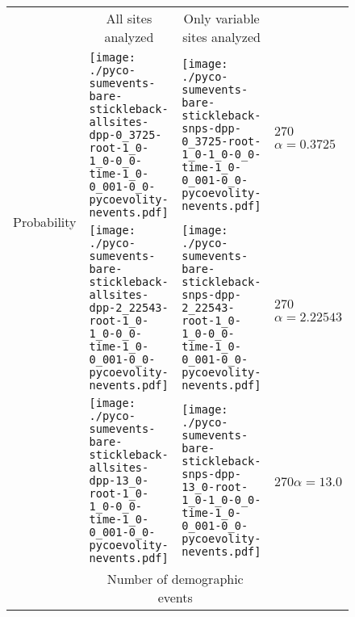 \documentclass[border=10pt,varwidth=30cm]{standalone}
\begin{document}
\begin{figure}
    \centering
    \begin{tabular}{@{}llll@{}}
        & \multicolumn{1}{c}{\large All sites analyzed} & \multicolumn{1}{c}{\large Only variable sites analyzed} & \\[1ex]
        \multirow{2}{*}[-4em]{\begin{sideways}\large Probability\end{sideways}}
        & \texttt{[image: ./pyco-sumevents-bare-stickleback-allsites-dpp-0\_3725-root-1\_0-1\_0-0\_0-time-1\_0-0\_001-0\_0-pycoevolity-nevents.pdf]}
        & \texttt{[image: ./pyco-sumevents-bare-stickleback-snps-dpp-0\_3725-root-1\_0-1\_0-0\_0-time-1\_0-0\_001-0\_0-pycoevolity-nevents.pdf]}
        & \multirow{1}{*}[8.5em]{\begin{rotate}{270}$\alpha = 0.3725$\end{rotate}} \\
        & \texttt{[image: ./pyco-sumevents-bare-stickleback-allsites-dpp-2\_22543-root-1\_0-1\_0-0\_0-time-1\_0-0\_001-0\_0-pycoevolity-nevents.pdf]}
        & \texttt{[image: ./pyco-sumevents-bare-stickleback-snps-dpp-2\_22543-root-1\_0-1\_0-0\_0-time-1\_0-0\_001-0\_0-pycoevolity-nevents.pdf]}
        & \multirow{1}{*}[8.5em]{\begin{rotate}{270}$\alpha = 2.22543$\end{rotate}} \\
        & \texttt{[image: ./pyco-sumevents-bare-stickleback-allsites-dpp-13\_0-root-1\_0-1\_0-0\_0-time-1\_0-0\_001-0\_0-pycoevolity-nevents.pdf]}
        & \texttt{[image: ./pyco-sumevents-bare-stickleback-snps-dpp-13\_0-root-1\_0-1\_0-0\_0-time-1\_0-0\_001-0\_0-pycoevolity-nevents.pdf]}
        & \multirow{1}{*}[8.5em]{\begin{rotate}{270}$\alpha = 13.0$\end{rotate}} \\
        & \multicolumn{2}{c}{\large Number of demographic events} & 
    \end{tabular}
\end{figure}
\end{document}

